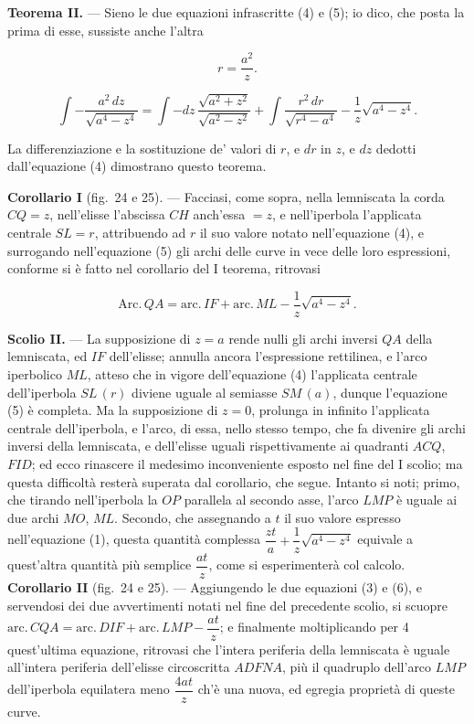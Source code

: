 \documentclass{article}
\begin{document}
\textbf{Teorema II.} --- Sieno le due equazioni infrascritte (4) e (5); io dico, che posta
la prima di esse, sussiste anche l'altra

\[ r = \frac{a^{2}}{z}. \tag{4} \]

\[ \int -\frac{a^{2}\,dz}{\sqrt{a^{4} - z^{4}}} = \int -dz\, \frac{\sqrt{a^{2} + z^{2}}}{\sqrt{a^{2} - z^{2}}} + \int \frac{r^{2}\,dr}{\sqrt{r^{4} - a^{4}}} - \frac{1}{z}\sqrt{a^{4} - z^{4}}. \tag{5} \]

La differenziazione e la sostituzione de' valori di $r$, e $dr$ in $z$, e $dz$ dedotti
dall'equazione (4) dimostrano questo teorema.

\textbf{Corollario I} (fig.~24 e 25). --- Facciasi, come sopra, nella lemniscata la corda
$CQ = z$, nell'elisse l'abscissa $CH$ anch'essa $= z$, e nell'iperbola l'applicata centrale
$SL = r$, attribuendo ad $r$ il suo valore notato nell'equazione (4), e surrogando
nell'equazione (5) gli archi delle curve in vece delle loro espressioni, conforme si è fatto
nel corollario del I teorema, ritrovasi

\[ \mathrm{Arc.}\,QA = \mathrm{arc.}\,IF + \mathrm{arc.}\,ML - \frac{1}{z}\sqrt{a^{4} - z^{4}}. \tag{6} \]

\textbf{Scolio II.} --- La supposizione di $z = a$ rende nulli gli archi inversi $QA$ della
lemniscata, ed $IF$ dell'elisse; annulla ancora l'espressione rettilinea, e l'arco iperbolico
$ML$, atteso che in vigore dell'equazione (4) l'applicata centrale dell'iperbola $SL\,(r)$
diviene uguale al semiasse $SM\,(a)$, dunque l'equazione (5) è completa. Ma la supposizione
di $z = 0$, prolunga in infinito l'applicata centrale dell'iperbola, e l'arco, di essa, nello
stesso tempo, che fa divenire gli archi inversi della lemniscata, e dell'elisse uguali
rispettivamente ai quadranti $ACQ$, $FID$; ed ecco rinascere il medesimo inconveniente
esposto nel fine del I scolio; ma questa difficoltà resterà superata dal corollario, che
segue. Intanto si noti; primo, che tirando nell'iperbola la $OP$ parallela al secondo asse,
l'arco $LMP$ è uguale ai due archi $MO$, $ML$. Secondo, che assegnando a $t$ il suo valore
espresso nell'equazione (1), questa quantità complessa $\dfrac{zt}{a} + \dfrac{1}{z}\sqrt{a^{4} - z^{4}}$
equivale a quest'altra quantità più semplice $\dfrac{at}{z}$, come si esperimenterà col calcolo.
\textbf{Corollario II} (fig.~24 e 25). --- Aggiungendo le due equazioni (3) e (6), e
servendosi dei due avvertimenti notati nel fine del precedente scolio, si scuopre
$\mathrm{arc.}\,CQA = \mathrm{arc.}\,DIF + \mathrm{arc.}\,LMP - \dfrac{at}{z}$; e finalmente
moltiplicando per 4 quest'ultima equazione, ritrovasi che l'intera periferia della lemniscata
è uguale all'intera periferia dell'elisse circoscritta $ADFNA$, più il quadruplo dell'arco
$LMP$ dell'iperbola equilatera meno $\dfrac{4at}{z}$ ch'è una nuova, ed egregia proprietà di
queste curve.
\end{document}

